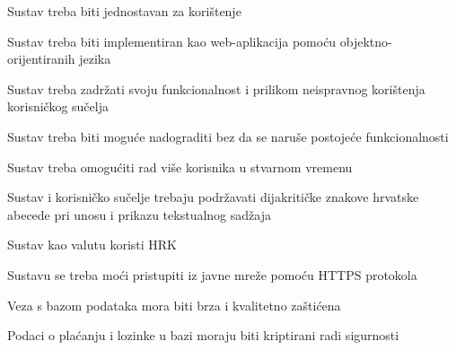 		\begin{packed_item}
			
			\item  Sustav treba biti jednostavan za korištenje
			\item  Sustav treba biti implementiran kao web-aplikacija pomoću objektno-orijentiranih jezika
			\item  Sustav treba zadržati svoju funkcionalnost i prilikom neispravnog korištenja korisničkog sučelja
			\item  Sustav treba biti moguće nadograditi bez da se naruše postojeće funkcionalnosti
			\item  Sustav treba omogućiti rad više korisnika u stvarnom vremenu
			\item  Sustav i korisničko sučelje trebaju podržavati dijakritičke znakove hrvatske abecede pri unosu i prikazu tekstualnog sadžaja
			\item  Sustav kao valutu koristi HRK
			\item  Sustavu se treba moći pristupiti iz javne mreže pomoću HTTPS protokola
			\item  Veza s bazom podataka mora biti brza i kvalitetno zaštićena
			\item  Podaci o plaćanju i lozinke u bazi moraju biti kriptirani radi sigurnosti
			
		\end{packed_item}
			
			 
			 
			 
	